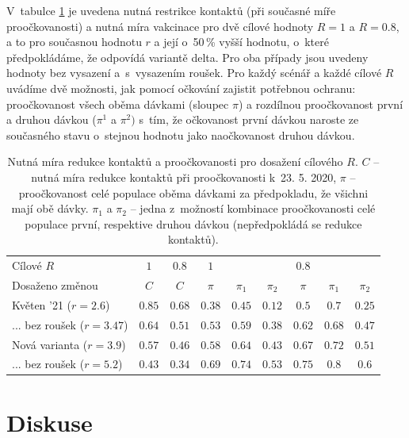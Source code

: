 V~tabulce \ref{tab:res} je uvedena nutná restrikce kontaktů (při současné
míře pro\-oč\-ko\-va\-nos\-ti) a nutná míra vakcinace pro dvě cílové hodnoty
$R=1$ a $R=0.8$, a to pro 
současnou hodnotu $r$ a její o~50\,\% vyšší hodnotu, o~které předpokládáme, že odpovídá variantě delta. Pro oba případy jsou uvedeny hodnoty bez vysazení a~s~vy\-sa\-zením roušek. Pro každý scénář a každé
cílové $R$ uvádíme dvě možnosti, jak pomocí očkování zajistit potřebnou ochranu:
proočkovanost všech oběma dávkami (sloupec $\pi$) a rozdílnou proočkovanost
první a druhou dávkou ($\pi^{1}$ a $\pi^{2})$ s~tím, že očkovanost první dávkou naroste ze současného stavu o~stejnou hodnotu jako naočkovanost druhou dávkou.
\begin{table}
\begin{center}
\begin{tabular}{l|c|c|ccc|ccc}									 Cílové $R$	& $1$	& $0.8$	& $1$	&	&	& $0.8$	&	&	\\  Dosaženo změnou	& $C$	& $C$	& $\pi$	& $\pi_1$	& $\pi_2$	& $\pi$	& $\pi_1$	& $\pi_2$	\\ \hline Květen '21 ($r=2.6$)	& $0.85$	& $0.68$	& $0.38$	& $0.45$	& $0.12$	& $0.5$	& $0.7$	& $0.25$	\\ ... bez roušek ($r=3.47$)	& $0.64$	& $0.51$	& $0.53$	& $0.59$	& $0.38$	& $0.62$	& $0.68$	& $0.47$	\\ Nová varianta ($r=3.9$)	& $0.57$	& $0.46$	& $0.58$	& $0.64$	& $0.43$	& $0.67$	& $0.72$	& $0.51$	\\ ... bez roušek ($r=5.2$)	& $0.43$	& $0.34$	& $0.69$	& $0.74$	& $0.53$	& $0.75$	& $0.8$	& $0.6$	\\ 
\end{tabular}		
\caption{Nutná míra redukce kontaktů a proočkovanosti pro dosažení cílového $R$. $C$ -- nutná míra redukce kontaktů při proočkovanosti k~23. 5. 2020, $\pi$ -- proočkovanost celé populace oběma dávkami za předpokladu, že všichni mají obě dávky. $\pi_1$ a $\pi_2$ -- jedna z~možností kombinace proočkovanosti celé populace první, respektive druhou dávkou (nepředpokládá se redukce kontaktů). }							 	 
\label{tab:res}
\end{center}

\end{table}


\section*{Diskuse}

